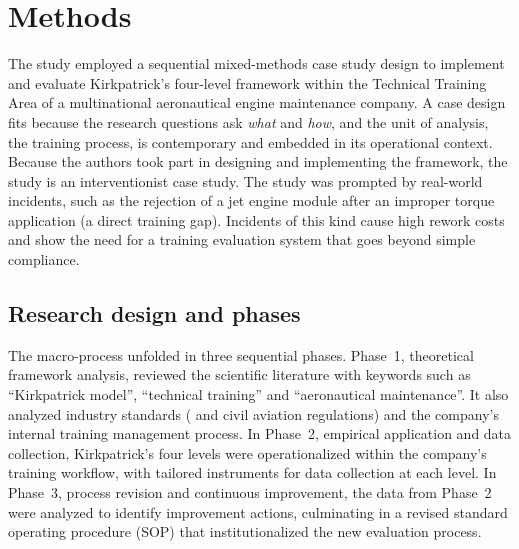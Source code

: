 
\section{Methods}
\label{sec:methods}

The study employed a sequential mixed-methods case study design to implement and evaluate Kirkpatrick's four-level framework within the Technical Training Area of a multinational aeronautical engine maintenance company. A case design fits because the research questions ask \textit{what} and \textit{how}, and the unit of analysis, the training process, is contemporary and embedded in its operational context. Because the authors took part in designing and implementing the framework, the study is an interventionist case study.  The study was prompted by real-world incidents, such as the rejection of a jet engine module after an improper torque application (a direct training gap). Incidents of this kind cause high rework costs and show the need for a training evaluation system that goes beyond simple compliance.

\subsection{Research design and phases}
\label{subsec:design}

The macro-process unfolded in three sequential phases. Phase~1, theoretical framework analysis, reviewed the scientific literature with keywords such as ``Kirkpatrick model'', ``technical training'' and ``aeronautical maintenance''. It also analyzed industry standards (\AS{} and civil aviation regulations) and the company's internal training management process. In Phase~2, empirical application and data collection, Kirkpatrick's four levels were operationalized within the company's training workflow, with tailored instruments for data collection at each level. In Phase~3, process revision and continuous improvement, the data from Phase~2 were analyzed to identify improvement actions, culminating in a revised standard operating procedure (SOP) that institutionalized the new evaluation process.

